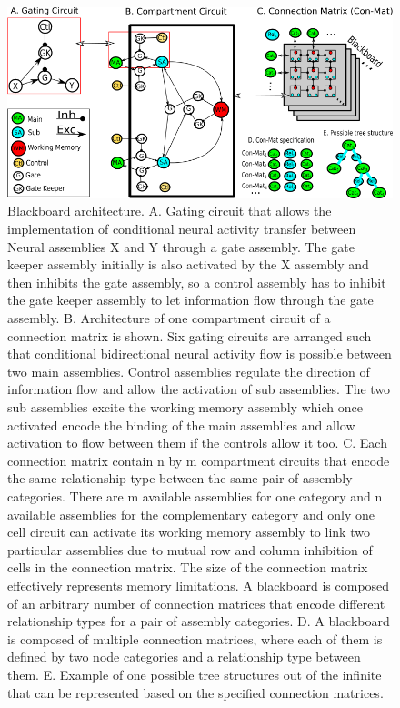 \documentclass[10pt]{article}
\begin{document}
\begin{figure}[h!]
  \begin{center}
    \includegraphics[width=1.00\columnwidth]{figures/gating_circuit3/gating_circuit3}
    \caption{{\label{Blackboard} Blackboard architecture. A. Gating
        circuit that allows the implementation of conditional neural
        activity transfer between Neural assemblies X and Y through a
        gate assembly. The gate keeper assembly initially is also
        activated by the X assembly and then inhibits the gate
        assembly, so a control assembly has to inhibit the gate keeper
        assembly to let information flow through the gate assembly. B.
        Architecture of one compartment circuit of a connection matrix
        is shown. Six gating circuits are arranged such that
        conditional bidirectional neural activity flow is possible
        between two main assemblies. Control assemblies regulate the
        direction of information flow and allow the activation of sub
        assemblies. The two sub assemblies excite the working memory
        assembly which once activated encode the binding of the main
        assemblies and allow activation to flow between them if the
        controls allow it too. C. Each connection matrix contain n by
        m compartment circuits that encode the same relationship type
        between the same pair of assembly categories. There are m
        available assemblies for one category and n available
        assemblies for the complementary category and only one cell
        circuit can activate its working memory assembly to link two
        particular assemblies due to mutual row and column inhibition
        of cells in the connection matrix. The size of the connection
        matrix effectively represents memory limitations. A blackboard
        is composed of an arbitrary number of connection matrices that
        encode different relationship types for a pair of assembly
        categories. D. A blackboard is composed of multiple connection
        matrices, where each of them is defined by two node categories
        and a relationship type between them. E. Example of one
        possible tree structures out of the infinite that can be
        represented based on the specified connection matrices.%
      }}
  \end{center}
\end{figure}
\end{document}
